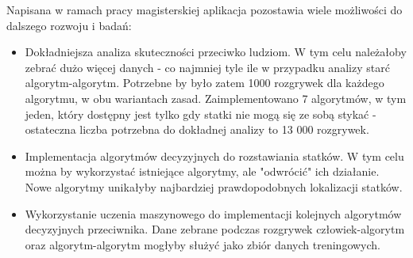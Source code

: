 Napisana w ramach pracy magisterskiej aplikacja pozostawia wiele możliwości do dalszego rozwoju i badań:
\begin{itemize}
    \item Dokładniejsza analiza skuteczności przeciwko ludziom. W tym celu należałoby zebrać dużo więcej danych - co najmniej tyle ile w przypadku analizy starć algorytm-algorytm. Potrzebne by było zatem 1000 rozgrywek dla każdego algorytmu, w obu wariantach zasad. Zaimplementowano 7 algorytmów, w tym jeden, który dostępny jest tylko gdy statki nie mogą się ze sobą stykać - ostateczna liczba potrzebna do dokładnej analizy to 13 000 rozgrywek.
    \item Implementacja algorytmów decyzyjnych do rozstawiania statków. W tym celu można by wykorzystać istniejące algorytmy, ale "odwrócić" ich działanie. Nowe algorytmy unikałyby najbardziej prawdopodobnych lokalizacji statków.
    \item Wykorzystanie uczenia maszynowego do implementacji kolejnych algorytmów decyzyjnych przeciwnika. Dane zebrane podczas rozgrywek człowiek-algorytm oraz algorytm-algorytm mogłyby służyć jako zbiór danych treningowych. 
\end{itemize}

\indent\ 